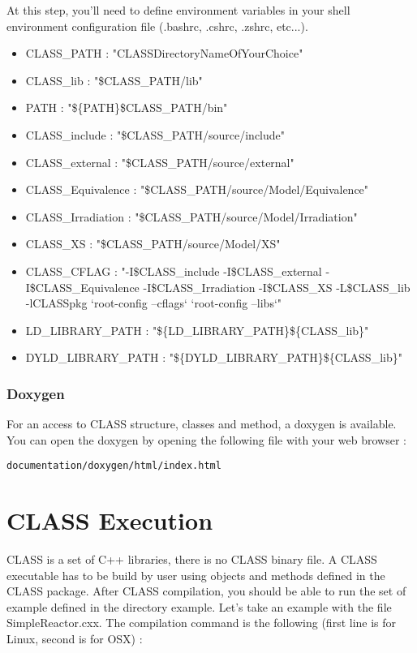 At this step, you'll need to define environment variables in your shell environment configuration file (.bashrc, .cshrc, .zshrc, etc...). 

\begin{itemize}
\item CLASS\_PATH : "CLASSDirectoryNameOfYourChoice"

\item CLASS\_lib : "\$CLASS\_PATH/lib"
\item PATH : "\$\{PATH\}\:\$CLASS\_PATH/bin"

\item CLASS\_include : "\$CLASS\_PATH/source/include"
\item CLASS\_external : "\$CLASS\_PATH/source/external"
\item CLASS\_Equivalence : "\$CLASS\_PATH/source/Model/Equivalence"
\item CLASS\_Irradiation : "\$CLASS\_PATH/source/Model/Irradiation"
\item CLASS\_XS : "\$CLASS\_PATH/source/Model/XS"

\item CLASS\_CFLAG : "-I\$CLASS\_include -I\$CLASS\_external -I\$CLASS\_Equivalence -I\$CLASS\_Irradiation -I\$CLASS\_XS -L\$CLASS\_lib -lCLASSpkg `root-config --cflags` `root-config --libs`"

\item LD\_LIBRARY\_PATH : "\$\{LD\_LIBRARY\_PATH\}\:\$\{CLASS\_lib\}"
\item DYLD\_LIBRARY\_PATH : "\$\{DYLD\_LIBRARY\_PATH\}\:\$\{CLASS\_lib\}"
\end{itemize}

\subsection{Doxygen}

For an access to CLASS structure, classes and method, a doxygen is available. You can open the doxygen by opening the following file with your web browser : 

\begin{center}
\begin{minipage}{\textwidth}
\begin{lstlisting}[style=terminal]
documentation/doxygen/html/index.html
\end{lstlisting}
\end{minipage}
\end{center}

\chapter{CLASS Execution}
CLASS is a set of C++ libraries, there is no CLASS binary file. A CLASS executable has to be build by user using objects and methods defined in the CLASS package. After CLASS compilation, you should be able to run the set of example defined in the directory example. Let's take an example with the file SimpleReactor.cxx. The compilation command is the following (first line is for Linux, second is for OSX) : 

